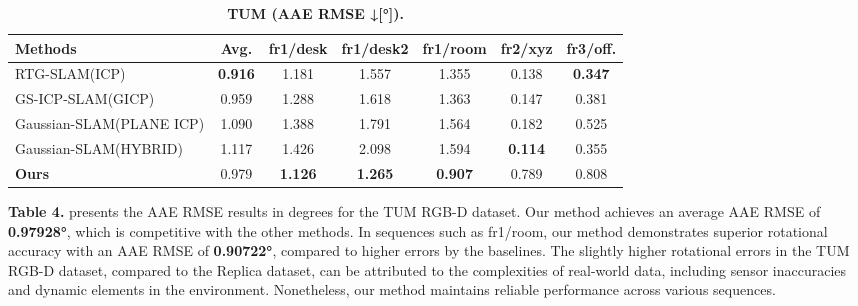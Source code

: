 \documentclass[twocolumn]{article} %
\begin{document}
\begin{table}[htbp]
\renewcommand{\thetable}{\textbf{\arabic{table}}}
\renewcommand{\tablename}{\textbf{Table}}
\centering
\caption{\textbf{TUM\cite{sturmBenchmarkEvaluationRGBD2012} (AAE RMSE ↓[°]).}}
\label{table:tum_AAE}
\begin{adjustbox}{max width=\columnwidth,max height=!,center}
\begin{tabular}{lcccccc}
\toprule
\textbf{Methods} & \textbf{Avg.} & \textbf{fr1/desk} & \textbf{fr1/desk2} & \textbf{fr1/room} & \textbf{fr2/xyz} & \textbf{fr3/off.}\\
\midrule
RTG-SLAM(ICP)\cite{pengRTGSLAMRealtime3D2024} & \cellcolor{green!30}\textbf{0.916} & \cellcolor{yellow!30}1.181 & \cellcolor{yellow!30}1.557 & \cellcolor{yellow!30}1.355 & \cellcolor{yellow!30}0.138 & \cellcolor{green!30}\textbf{0.347}\\
GS-ICP-SLAM(GICP)\cite{haRGBDGSICPSLAM2024} & \cellcolor{yellow!30}0.959 & \cellcolor{lime!50}1.288 & \cellcolor{lime!50}1.618 & \cellcolor{lime!50}1.363 & \cellcolor{lime!50}0.147 & \cellcolor{lime!50}0.381\\
Gaussian-SLAM(PLANE ICP)\cite{yugayGaussianSLAMPhotorealisticDense2024} & 1.090 & 1.388 & 1.791 & 1.564 & 0.182 & 0.525\\
Gaussian-SLAM(HYBRID)\cite{yugayGaussianSLAMPhotorealisticDense2024} & 1.117 & 1.426 & 2.098 & 1.594 & \cellcolor{green!30}\textbf{0.114} & \cellcolor{yellow!30}0.355\\
\midrule
\textbf{Ours} & \cellcolor{lime!50}0.979 & \cellcolor{green!30}\textbf{1.126} & \cellcolor{green!30}\textbf{1.265} & \cellcolor{green!30}\textbf{0.907} & 0.789 & 0.808\\
\bottomrule
\end{tabular}
\end{adjustbox}
\end{table}

\textbf{Table 4.} presents the AAE RMSE results in degrees for the TUM
RGB-D dataset. Our method achieves an average AAE RMSE of
\textbf{0.97928°}, which is competitive with the other methods. In
sequences such as fr1/room, our method demonstrates superior rotational
accuracy with an AAE RMSE of \textbf{0.90722°}, compared to higher
errors by the baselines. The slightly higher rotational errors in the
TUM RGB-D dataset, compared to the Replica dataset, can be attributed to
the complexities of real-world data, including sensor inaccuracies and
dynamic elements in the environment. Nonetheless, our method maintains
reliable performance across various sequences.
\end{document}
